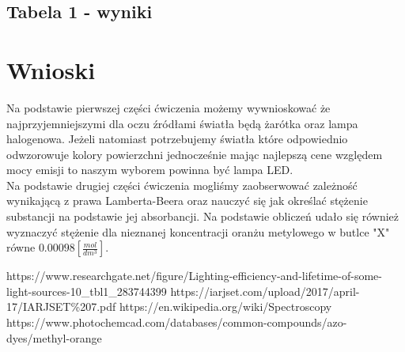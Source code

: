 \documentclass[11pt]{article}
\begin{document}
    \subsection{Tabela 1 - wyniki}
    \begin{center}
        \Large{}
    \end{center}

    \section{Wnioski}
    \par Na podstawie pierwszej części ćwiczenia możemy wywnioskować że najprzyjemniejszymi dla oczu źródłami światła będą
    żarótka oraz lampa halogenowa. Jeżeli natomiast potrzebujemy światła które odpowiednio odwzorowuje kolory powierzchni jednocześnie
    mając najlepszą cene względem mocy emisji to naszym wyborem powinna być lampa LED.\\
    \indent Na podstawie drugiej części ćwiczenia mogliśmy zaobserwować zależność wynikającą z prawa Lamberta-Beera oraz nauczyć się
    jak określać stężenie substancji na podstawie jej absorbancji. Na podstawie obliczeń udało się również wyznaczyć stężenie dla
    nieznanej koncentracji oranżu metylowego w butlce "X" równe $0.00098[\frac{mol}{dm^3}]$.



    \vfill
    \footnotesize
    \begin{thebibliography}{3}
        https://www.researchgate.net/figure/Lighting-efficiency-and-lifetime-of-some-light-sources-10\_tbl1\_283744399
        https://iarjset.com/upload/2017/april-17/IARJSET\%207.pdf
        https://en.wikipedia.org/wiki/Spectroscopy
        https://www.photochemcad.com/databases/common-compounds/azo-dyes/methyl-orange
    \end{thebibliography}
\end{document}
